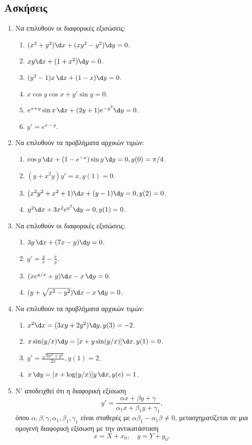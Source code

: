 \documentclass[11pt,a4paper,twoside]{book}
\begin{document}
\subsection{Ασκήσεις}
\begin{enumerate}
\item Να επιλυθούν οι διαφορικές εξισώσεις:
\begin{enumerate}[label=(\roman*)]
\item $(x^2+y^2)\d x+(xy^2-y^2)\d y=0$.
\item $xy \d x + (1+x^2)\d y=0$.
\item $(y^2-1)x\,\d x + (1-x)\d y=0$.
\item $x\cos y \cos x + y' \sin y = 0$.
\item $e^{x+y}\sin x\,\d x+(2y+1)e^{-y^2}\d y=0$.
\item $y'=e^{x-y}$.
\end{enumerate}

\item Να επιλυθούν τα προβλήματα αρχικών τιμών:
\begin{enumerate}[label=(\roman*)]
\item $\cos y\,\d x+(1-e^{-x})\sin y\,\d y = 0, y(0)=\pi/4$.
\item $(y+x^2y)y' = x, y(1)=0$.
\item $(x^2y^2+x^2+1)\d x+(y-1)\d y=0, y(2)=0$.
\item $y^2\d x+3x^2e^{y^2}\d y=0, y(1)=0$.
\end{enumerate}

\item Να επιλυθούν οι διαφορικές εξισώσεις:
\begin{enumerate}[label=(\roman*)]
\item $3y\,\d x+(7x-y)\d y=0$.
\item $y' = \frac{y}{x} - \frac{x}{y}$.
\item $(xe^{y/x}+y)\d x-x\,\d y=0$.
\item $(y+\sqrt{x^2-y^2})\d x-x\,\d y=0$.
\end{enumerate}

\item Να επιλυθούν τα προβλήματα αρχικών τιμών:
\begin{enumerate}[label=(\roman*)]
\item $x^2\d x = (3xy+2y^2)\d y, y(3)=-2$.
\item $x\sin(y/x)\d y=[x+y\sin(y/x)]\d x, y(1)=0$.
\item $y'=\frac{\sqrt{3x^2+y^2}}{2x}, y(1)=2$.
\item $x\,\d y = [x+\log(y/x)]y\,\d x, y(e)=1$.
\end{enumerate}

\item Ν' αποδειχθεί ότι η διαφορική εξίσωση
\[
y'=\frac{\alpha x + \beta y + \gamma}{\alpha_1 x + \beta_1 y + \gamma_1},
\]
όπου $\alpha, \beta, \gamma, \alpha_1, \beta_1, \gamma_1$ είναι σταθερές με $\alpha\beta_1-\alpha_1\beta \neq 0$, μετασχηματίζεται σε μια ομογενή διαφορική εξίσωση με την αντικατάσταση
\[
x=X+x_0, \quad y=Y+y_0,
\]
\end{enumerate}
\end{document}
